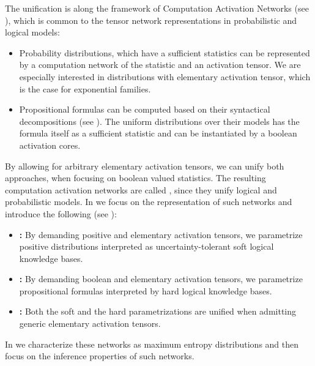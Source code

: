 The unification is along the framework of Computation Activation Networks (see ), which is common to the tensor network representations in probabilistic and logical models:
\begin{itemize}
    \item Probability distributions, which have a sufficient statistics can be represented by a computation network of the statistic and an activation tensor.
    We are especially interested in distributions with elementary activation tensor, which is the case for exponential families.
    \item Propositional formulas can be computed based on their syntactical decompositions (see ).
    The uniform distributions over their models has the formula itself as a sufficient statistic and can be instantiated by a boolean activation cores.
\end{itemize}
By allowing for arbitrary elementary activation tensors, we can unify both approaches, when focusing on boolean valued statistics.
The resulting computation activation networks are called \HybridLogicNetworks{}, since they unify logical and probabilistic models.
In  we focus on the representation of such networks and introduce the following (see ):
\begin{itemize}
    \item \textbf{\MarkovLogicNetworks{}:} By demanding positive and elementary activation tensors, we parametrize positive distributions interpreted as uncertainty-tolerant soft logical knowledge bases.
    \item \textbf{\HardLogicNetworks{}:} By demanding boolean and elementary activation tensors, we parametrize propositional formulas interpreted by hard logical knowledge bases.
    \item \textbf{\HybridLogicNetworks{}:} Both the soft and the hard parametrizations are unified when admitting generic elementary activation tensors.
\end{itemize}
In  we characterize these networks as maximum entropy distributions and then focus on the inference properties of such networks.

